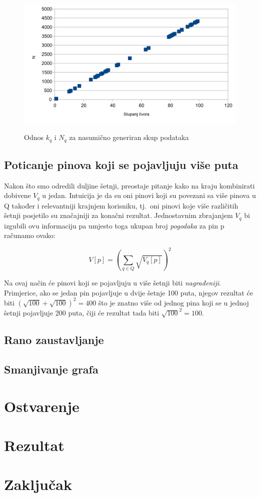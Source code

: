 \documentclass[times, utf8, seminar]{fer}
\begin{document}
\begin{figure}[h]
	\centering
	\includegraphics[width=\textwidth]{degree_chart}
	\caption{Odnos $k_q$ i $N_q$ za nasumično generiran skup podataka}
	\cite{medium-article}
	\label{fig:pins_boards}
\end{figure}

\section{Poticanje pinova koji se pojavljuju više puta}

Nakon što smo odredili duljine šetnji, preostaje pitanje kako na kraju kombinirati dobivene $V_q$ u jedan. Intuicija je da su oni pinovi koji su povezani sa više pinova u Q također i relevantniji krajnjem korisniku, tj.\ oni pinovi koje više različitih šetnji posjetilo su značajniji za konačni rezultat. Jednostavnim zbrajanjem $V_q$ bi izgubili ovu informaciju pa umjesto toga ukupan broj \textit{pogodaka} za pin p računamo ovako:

\begin{centering}
		  $$ V[p] = (\sum_{q \in Q}{\sqrt{V_q[p]}})^2 $$
		  \par
\end{centering}

Na ovaj način će pinovi koji se pojavljuju u više šetnji biti \textit{nagrađeniji}. Primjerice, ako se jedan pin pojavljuje u dvije šetnje 100 puta, njegov rezultat će biti $ (\sqrt{100} + \sqrt{100})^2 = 400 $ što je znatno više od jednog pina koji se u jednoj šetnji pojavljuje 200 puta, čiji će rezultat tada biti $ \sqrt{100}^2 = 100 $.

\section{Rano zaustavljanje}

\section{Smanjivanje grafa}

\chapter{Ostvarenje}

\chapter{Rezultat}

\chapter{Zaključak}



\end{document}

